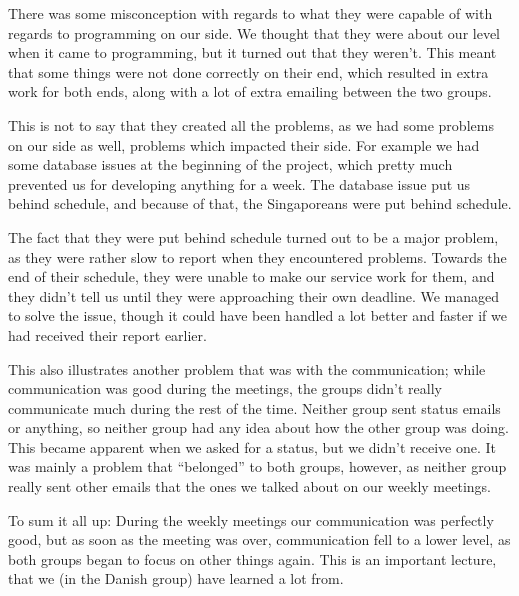 \documentclass[11pt, danish, a4paper, oneside]{report}
\begin{document}
There was some misconception with regards to what they were capable of with regards to programming on our side. We thought that they were about our level when it came to programming, but it turned out that they weren't. This meant that some things were not done correctly on their end, which resulted in extra work for both ends, along with a lot of extra emailing between the two groups.

This is not to say that they created all the problems, as we had some problems on our side as well, problems which impacted their side. For example we had some database issues at the beginning of the project, which pretty much prevented us for developing anything for a week. The database issue put us behind schedule, and because of that, the Singaporeans were put behind schedule.

The fact that they were put behind schedule turned out to be a major problem, as they were rather slow to report when they encountered problems. Towards the end of their schedule, they were unable to make our service work for them, and they didn't tell us until they were approaching their own deadline. We managed to solve the issue, though it could have been handled a lot better and faster if we had received their report earlier. 

This also illustrates another problem that was with the communication; while communication was good during the meetings, the groups didn't really communicate much during the rest of the time. Neither group sent status emails or anything, so neither group had any idea about how the other group was doing. This became apparent when we asked for a status, but we didn't receive one. It was mainly a problem that ``belonged'' to both groups, however, as neither group really sent other emails that the ones we talked about on our weekly meetings.

To sum it all up: During the weekly meetings our communication was perfectly good, but as soon as the meeting was over, communication fell to a lower level, as both groups began to focus on other things again. This is an important lecture, that we (in the Danish group) have learned a lot from.
\end{document}
